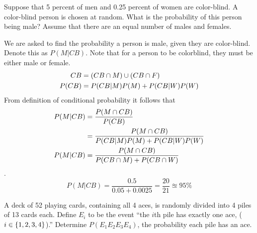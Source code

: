 \documentclass{article}
\begin{document}
    \nextproblem

    \begin{problem}
        Suppose that 5 percent of men and 0.25 percent of women are color-blind. A color-blind person is chosen at random. What is the probability of this person being male? Assume that there are an equal number of males and females. 
    \end{problem}

    \begin{solution}
        We are asked to find the probability a person is male, given they are color-blind. Denote this as $P(M | CB)$. Note that for a person to be colorblind, they must be either male or female.
        \begin{align}
            CB &= (CB \cap M) \cup (CB \cap F) \\
            P(CB) &= P(CB | M) P(M) + P(CB | W) P(W)
        \end{align}
        From definition of conditional probability it follows that
        \begin{equation}
            \begin{aligned}
                P(M | CB) &= \frac{P(M \cap CB)} {P(CB)} \\
                          &= \frac{P(M \cap CB)} {P(CB | M) P(M) + P(CB | W) P(W)} \\
                P(M | CB) &= \frac{P(M \cap CB)} {P(CB \cap M) + P(CB \cap W)}
            \end{aligned}
        \end{equation}
        .
        \begin{equation}
            P(M | CB) = \frac{0.5} {0.05 + 0.0025} = \frac{20}{21} \approxeq 95\%
        \end{equation}
    \end{solution}

    \nextproblem

    \begin{problem}
        A deck of 52 playing cards, containing all 4 aces, is randomly divided into 4 piles of 13 cards each. Define $E_i$ to be the event ``the $i$th pile has exactly one ace, ($i \in \{1, 2, 3, 4\}$).'' Determine $P(E_1 E_2 E_3 E_4)$, the probability each pile has an ace. 
    \end{problem}
\end{document}
